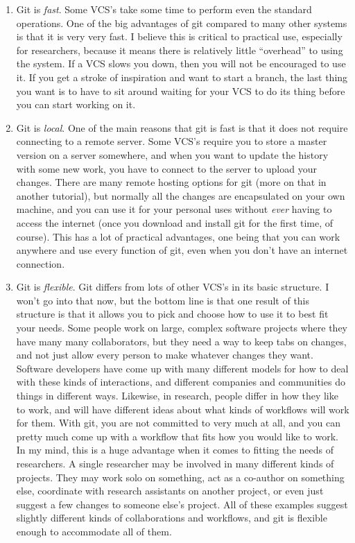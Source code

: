 \documentclass{article}
\begin{document}
\begin{enumerate}
\item Git is \emph{fast}.  Some VCS's take some time to perform even the standard operations. One of the big advantages of git compared to many other systems is that it is very very fast. I believe this is critical to practical use, especially for researchers, because it means there is relatively little ``overhead'' to using the system.  If a VCS slows you down, then you will not be encouraged to use it. If you get a stroke of inspiration and want to start a branch, the last thing you want is to have to sit around waiting for your VCS to do its thing before you can start working on it.
\item Git is \emph{local}. One of the main reasons that git is fast is that it does not require connecting to a remote server. Some VCS's require you to store a master version on a server somewhere, and when you want to update the history with some new work, you have to connect to the server to upload your changes. There are many remote hosting options for git (more on that in another tutorial), but normally all the changes are encapsulated on your own machine, and you can use it for your personal uses without \emph{ever} having to access the internet (once you download and install git for the first time, of course). This has a lot of practical advantages, one being that you can work anywhere and use every function of git, even when you don't have an internet connection.
\item Git is \emph{flexible}. Git differs from lots of other VCS's in its basic structure. I won't go into that now, but the bottom line is that one result of this structure is that it allows you to pick and choose how to use it to best fit your needs. Some people work on large, complex software projects where they have many many collaborators, but they need a way to keep tabs on changes, and not just allow every person to make whatever changes they want. Software developers have come up with many different models for how to deal with these kinds of interactions, and different companies and communities do things in different ways. Likewise, in research, people differ in how they like to work, and will have different ideas about what kinds of workflows will work for them.  With git, you are not committed to very much at all, and you can pretty much come up with a workflow that fits how you would like to work. In my mind, this is a huge advantage when it comes to fitting the needs of researchers. A single researcher may be involved in many different kinds of projects.  They may work solo on something, act as a co-author on something else, coordinate with research assistants on another project, or even just suggest a few changes to someone else's project. All of these examples suggest slightly different kinds of collaborations and workflows, and git is flexible enough to accommodate all of them.

\end{enumerate}
\end{document}
